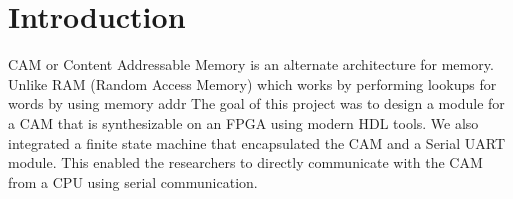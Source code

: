 \section{Introduction}
CAM or Content Addressable Memory is an alternate architecture for memory. Unlike RAM (Random Access Memory) which works by performing lookups for words by using memory addr
The goal of this project was to design a module for a CAM that is synthesizable on an FPGA using modern HDL tools. 
We also integrated a finite state machine that encapsulated the CAM and a Serial UART module. 
This enabled the researchers to directly communicate with the CAM from a CPU using serial communication. 
